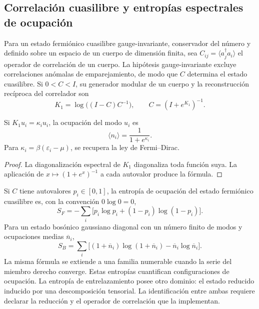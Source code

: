 \subsection{Correlación cuasilibre y entropías espectrales de ocupación}

Para un estado fermiónico cuasilibre gauge-invariante, conservador del
número y definido sobre un espacio de un cuerpo de dimensión finita, sea
\(C_{ij}=\langle a_j^\dagger a_i\rangle\) el operador de correlación de un
cuerpo. La hipótesis gauge-invariante excluye correlaciones anómalas de
emparejamiento, de modo que \(C\) determina el estado cuasilibre. Si
\(0<C<I\), su generador modular de un cuerpo y la reconstrucción recíproca
del correlador son
\begin{equation}
 \boxed{
 K_1=\log\bigl((I-C)C^{-1}\bigr),
 \qquad
 C=(I+e^{K_1})^{-1}.}
 \label{eq:puente-cuasilibre-modular-rev3}
\end{equation}

\begin{corollary}
\label{cor:forma-logistica-modular-rev3}
Si \(K_1u_i=\kappa_i u_i\), la ocupación del modo \(u_i\) es
\[
 \langle n_i\rangle=\frac1{1+e^{\kappa_i}}.
\]
Para \(\kappa_i=\beta(\varepsilon_i-\mu)\), se recupera la ley de
Fermi--Dirac.
\end{corollary}

\begin{proof}
La diagonalización espectral de \(K_1\) diagonaliza toda función suya. La
aplicación de \(x\mapsto(1+e^x)^{-1}\) a cada autovalor produce la fórmula.
\end{proof}

Si \(C\) tiene autovalores \(p_i\in[0,1]\), la entropía de ocupación del
estado fermiónico cuasilibre es, con la convención \(0\log0=0\),
\begin{equation}
 S_F=-\sum_i\bigl[p_i\log p_i+(1-p_i)\log(1-p_i)\bigr].
 \label{eq:entropia-cuasilibre-fermi-rev3}
\end{equation}
Para un estado bosónico gaussiano diagonal con un número finito de modos y
ocupaciones medias \(\overline n_i\),
\begin{equation}
 S_B=\sum_i\bigl[(1+\overline n_i)\log(1+\overline n_i)
                  -\overline n_i\log\overline n_i\bigr].
 \label{eq:entropia-gaussiana-bose-rev3}
\end{equation}
La misma fórmula se extiende a una familia numerable cuando la serie del
miembro derecho converge.
Estas entropías cuantifican configuraciones de ocupación. La entropía de
entrelazamiento posee otro dominio: el estado reducido inducido por una
descomposición tensorial. La identificación entre ambas requiere declarar la
reducción y el operador de correlación que la implementan.

